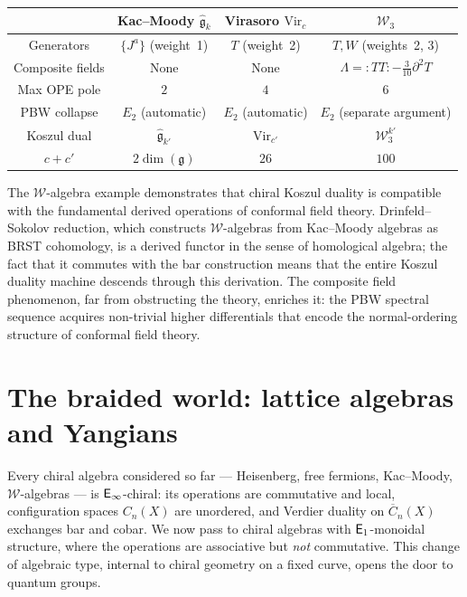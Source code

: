 \begin{center}
\small
\begin{tabular}{c|c|c|c}
& \textbf{Kac--Moody}
  $\widehat{\mathfrak{g}}_k$ &
\textbf{Virasoro}
  $\mathrm{Vir}_c$ &
$\mathcal{W}_3$ \\
\hline
Generators & $\{J^a\}$ (weight~1)
  & $T$ (weight~2)
  & $T, W$ (weights~2, 3) \\
Composite fields & None
  & None
  & $\Lambda = :\!TT\!: - \tfrac{3}{10}\partial^2 T$ \\
Max OPE pole & $2$ & $4$ & $6$ \\
PBW collapse & $E_2$ (automatic)
  & $E_2$ (automatic)
  & $E_2$ (separate argument) \\
Koszul dual & $\widehat{\mathfrak{g}}_{k'}$
  & $\mathrm{Vir}_{c'}$
  & $\mathcal{W}_3^{k'}$ \\
$c + c'$ & $2\dim(\mathfrak{g})$ & $26$ & $100$
\end{tabular}
\end{center}

The $\mathcal{W}$-algebra example demonstrates that chiral Koszul
duality is compatible with the fundamental derived operations of
conformal field theory.  Drinfeld--Sokolov reduction, which constructs
$\mathcal{W}$-algebras from Kac--Moody algebras as BRST cohomology,
is a derived functor in the sense of homological algebra; the fact
that it commutes with the bar construction means that the entire
Koszul duality machine descends through this derivation.  The
composite field phenomenon, far from obstructing the theory,
enriches it: the PBW spectral sequence acquires non-trivial higher
differentials that encode the normal-ordering structure of conformal
field theory.

\section{\texorpdfstring{The braided world: lattice algebras and Yangians}{The braided world: lattice algebras and Yangians}}
\label{sec:frame-yangian-preview}

Every chiral algebra considered so far --- Heisenberg, free fermions,
Kac--Moody, $\mathcal{W}$-algebras --- is $\mathsf{E}_{\infty}$-chiral:
its operations are commutative and local, configuration spaces
$C_n(X)$ are unordered, and Verdier duality on $\overline{C}_n(X)$
exchanges bar and cobar.  We now pass to chiral algebras with
$\mathsf{E}_1$-monoidal structure, where the operations are associative
but \emph{not} commutative.  This change of algebraic type, internal
to chiral geometry on a fixed curve, opens the door to quantum groups.

